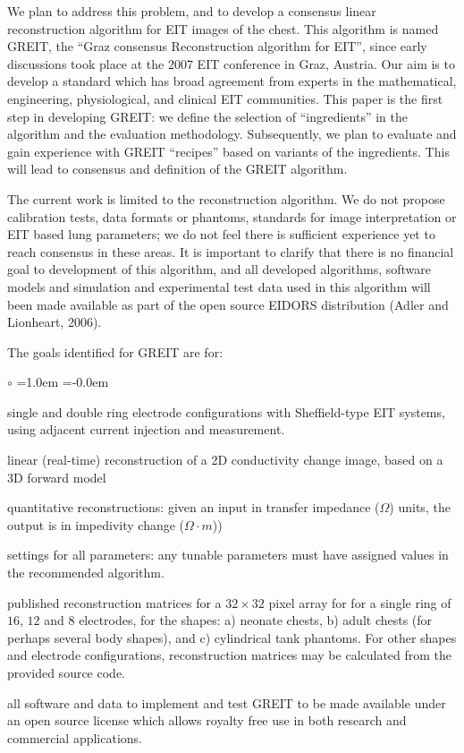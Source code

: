 \documentclass[letterpaper,twocolumn,10pt]{article}
\begin{document}
We plan to address this problem, and to develop a
consensus linear reconstruction algorithm for EIT
images of the chest.
This algorithm is named GREIT, 
the ``Graz consensus Reconstruction algorithm for EIT'',
since early discussions took place at the 2007 EIT conference
in Graz, Austria. Our aim is to develop a standard which
has broad agreement from experts in the mathematical,
engineering, physiological, and clinical EIT communities.
This paper is the first step in developing GREIT:
we define the selection of ``ingredients'' in the
algorithm and the evaluation 
methodology. Subsequently, we plan to evaluate
and gain experience with GREIT ``recipes'' based on 
variants of the ingredients. This will lead to 
consensus and definition of the GREIT algorithm.

The current work is limited to the reconstruction algorithm.
We do not propose calibration tests, data formats or phantoms, standards
for image interpretation or EIT based lung parameters; 
we do not feel there is sufficient experience yet to reach
consensus in these areas.
It is important to clarify that there is no financial
goal to development of this algorithm,
and all developed algorithms, software
models and simulation and experimental test data used
in this algorithm will been made available as part of
the open source EIDORS distribution (Adler and Lionheart, 2006).

The goals identified for GREIT are for:
\begin{list}{$\circ$} %
  {\leftmargin=1.0em \itemindent=-0.0em
    \baselineskip
    \baselineskip}
\item
 single and double ring electrode
configurations with Sheffield-type EIT systems, using
      adjacent current injection and measurement.
\item
 linear (real-time) reconstruction of a 2D conductivity
change image, based on a 3D forward model
\item
 quantitative reconstructions:
   given an input in transfer impedance ($\Omega$) units,
                    the output is in impedivity change ($\Omega\cdot m$))
\item
 settings for all parameters:
     any tunable parameters must have assigned
     values in the recommended algorithm.
\item
 published reconstruction matrices for
      a $32\times 32$ pixel array for
      for a single ring of $16$, $12$ and $8$ 
      electrodes, for the shapes:
   a) neonate chests, 
   b) adult chests (for perhaps several body shapes), and 
   c) cylindrical tank phantoms.
 For other shapes and electrode configurations,
   reconstruction matrices may be calculated from the
   provided source code.

\item
   all software and data to implement and test GREIT to be
   made available under an open source license which allows 
   royalty free use in both research and commercial applications.

\end{list}
\end{document}
